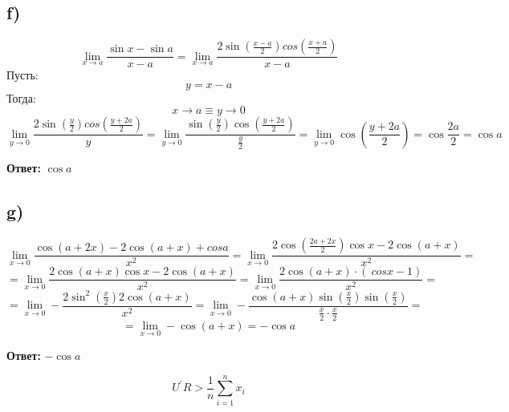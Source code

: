 \documentclass[a4paper,12pt]{article}
\begin{document}
\subsection*{f)}
\[
\lim_{x \rightarrow a} \frac{\sin x - \sin a}{x - a} = \lim_{x \rightarrow a} \frac{2\sin \left(\frac{x-a}{2} \right) cos  \left(\frac{x+a}{2} \right) }{x-a} 
\]
Пусть:
\[
y = x - a 
\]
Тогда:
\[
x \rightarrow a \equiv y \rightarrow 0
\]
\[
\lim_{y \rightarrow 0} \frac{2\sin \left(\frac{y}{2}\right) cos \left(\frac{y+2a}{2}\right)}{y} =  \lim_{y \rightarrow 0} \frac{\sin \left( \frac{y}{2} \right) \cos \left( \frac{y+2a}{2} \right )}{\frac{y}{2}} = \lim_{y \rightarrow 0} \cos \left(\frac{y+2a}{2}\right)= \cos \frac{2a}{2}=  \cos a
\]
\begin{center}
\textbf{Ответ: } $\cos a$
\end{center}

\subsection*{g)} 
\[
\lim_{x \rightarrow 0} \frac{\cos (a+2x) - 2 \cos (a +x) + cos a}{x^2} = \lim_{x \rightarrow 0} \frac{2\cos \left(\frac{2a+2x}{2}\right)\cos x - 2\cos (a + x)}{x^2} =
\]
\[
= \lim_{x \rightarrow 0} \frac{2\cos(a+x) \cos x - 2\cos (a+x)}{x^2} = \lim_{x \rightarrow 0} \frac{2\cos (a+x) \cdot (\ cos x - 1)}{x^2} =
\]
\[
= \lim_{x \rightarrow 0} - \frac{2\sin^2 \left( \frac{x}{2} \right) 2 \cos (a + x)}{x^2} = \lim_{x \rightarrow 0}- \frac{\cos(a +x) \sin \left(\frac{x}{2}\right) \sin \left(\frac{x}{2}\right)}{\frac{x}{2} \cdot \frac{x}{2}} =
\]
\[
= \lim_{x \rightarrow 0} - \cos (a  + x) = -\cos a
\]
\begin{center}
\textbf{Ответ: } $- \cos a$
\end{center}
\newpage
\[
U^{'} R > \frac{1}{n} \sum_{i = 1}^{n} x_i
\]
\end{document}
